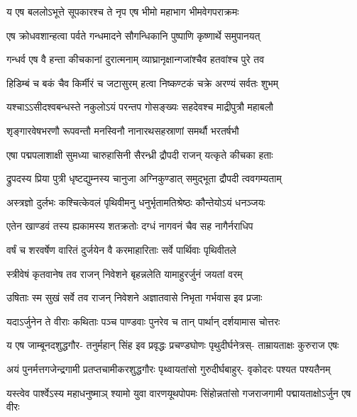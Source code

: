 


\twolineshloka
{य एष बललोऽभूत्ते सूपकारश्च ते नृप}
{एष भीमो महाभाग भीमवेगपराक्रमः}


\twolineshloka
{एष क्रोधवशान्हत्वा पर्वते गन्धमादने}
{सौगन्धिकानि पुष्पाणि कृष्णार्थे समुपानयत्}


\twolineshloka
{गन्धर्व एष वै हन्ता कीचकानां दुरात्मनाम्}
{व्याघ्रानृक्षान्गजांश्चैव हतवांश्च पुरे तव}


\twolineshloka
{हिडिम्बं च बकं चैव किर्मीरं च जटासुरम्}
{हत्वा निष्कण्टकं चक्रे अरण्यं सर्वतः शुभम्}


\twolineshloka
{यश्चाऽऽसीदश्वबन्धस्ते नकुलोऽयं परन्तप}
{गोसङ्ख्यः सहदेवश्च माद्रीपुत्रौ महाबलौ}


\twolineshloka
{शृङ्गारवेषभरणौ रूपवन्तौ मनस्विनौ}
{नानारथसहस्राणां समर्थौ भरतर्षभौ}


\twolineshloka
{एषा पद्मपलाशाक्षी सुमध्या चारुहासिनी}
{सैरन्ध्री द्रौपदी राजन् यत्कृते कीचका हताः}


\twolineshloka
{द्रुपदस्य प्रिया पुत्री धृष्टद्युम्नस्य चानुजा}
{अग्निकुण्डात् समुद्भूता द्रौपदी त्ववगम्यताम्}



\twolineshloka
{अस्त्रज्ञो दुर्लभः कश्चित्केवलं पृथिवीमनु}
{धनुर्भृतामतिश्रेष्ठः कौन्तेयोऽयं धनञ्जयः}


\twolineshloka
{एतेन खाण्डवं तस्य ह्यकामस्य शतक्रतोः}
{दग्धं नागवनं चैव सह नागैर्नराधिप}


\twolineshloka
{वर्षं च शरवर्षेण वारितं दुर्जयेन वै}
{करमाहारिताः सर्वे पार्थिवाः पृथिवीतले}


\twolineshloka
{स्त्रीवेषं कृतवानेष तव राजन् निवेशने}
{बृहन्नलेति यामाहुरर्जुनं जयतां वरम्}


\twolineshloka
{उषिताः स्म सुखं सर्वे तव राजन् निवेशने}
{अज्ञातवासे निभृता गर्भवास इव प्रजाः}



\twolineshloka
{यदाऽर्जुनेन ते वीराः कथिताः पञ्च पाण्डवाः}
{पुनरेव च तान् पार्थान् दर्शयामास चोत्तरः}



\fourlineindentedshloka
{य एष जाम्बूनदशुद्धगौर-}
{तनुर्महान् सिंह इव प्रवृद्धः}
{प्रचण्डघोणः पृथुदीर्घनेत्रस्-}
{ताम्रायताक्षः कुरुराज एषः}


\fourlineindentedshloka
{अयं पुनर्मत्तगजेन्द्रगामी}
{प्रतप्तचामीकरशुद्धगौरः}
{पृथ्वायतांसो गुरुदीर्घबाहुर्-}
{वृकोदरः पश्यत पश्यतैनम्}


\fourlineindentedshloka
{यस्त्वेव पार्श्वेऽस्य महाधनुष्माञ्}
{श्यामो युवा वारणयूथपोपमः}
{सिंहोन्नतांसो गजराजगामी}
{पद्मायताक्षोऽर्जुन एष वीरः}


